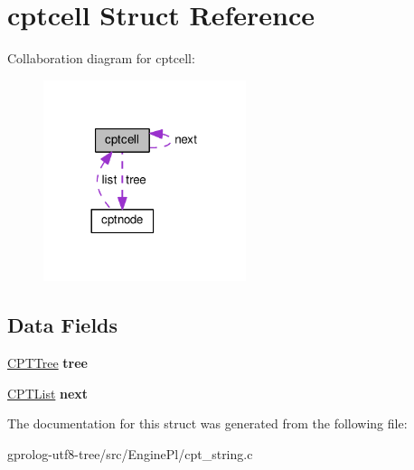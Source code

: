 \hypertarget{structcptcell}{}\section{cptcell Struct Reference}
\label{structcptcell}


Collaboration diagram for cptcell\+:\nopagebreak
\begin{figure}[H]
\begin{center}
\leavevmode
\includegraphics[width=168pt]{structcptcell__coll__graph}
\end{center}
\end{figure}
\subsection*{Data Fields}
\begin{DoxyCompactItemize}
\item 
\hyperlink{structcptnode}{C\+P\+T\+Tree} {\bfseries tree}\hypertarget{structcptcell_a8ce1e2723947c6ebce10520f1fcee6be}{}\label{structcptcell_a8ce1e2723947c6ebce10520f1fcee6be}

\item 
\hyperlink{structcptcell}{C\+P\+T\+List} {\bfseries next}\hypertarget{structcptcell_a20fc8bb9280bb623be1dc9e5089df7bb}{}\label{structcptcell_a20fc8bb9280bb623be1dc9e5089df7bb}

\end{DoxyCompactItemize}


The documentation for this struct was generated from the following file\+:\begin{DoxyCompactItemize}
\item 
gprolog-\/utf8-\/tree/src/\+Engine\+Pl/cpt\+\_\+string.\+c\end{DoxyCompactItemize}
